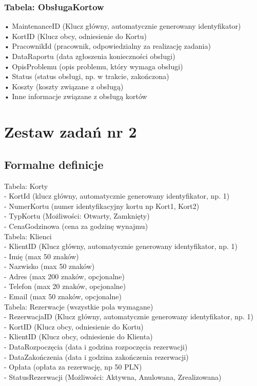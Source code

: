 \documentclass{article}
\begin{document}
\subsubsection*{Tabela: ObsługaKortow}
•	MaintenanceID (Klucz główny, automatycznie generowany identyfikator)\\
•	KortID (Klucz obcy, odniesienie do Kortu)\\
•	PracownikId (pracownik, odpowiedzialny za realizację zadania)\\
•	DataRaportu (data zgłoszenia konieczności obsługi)\\
•	OpisProblemu (opis problemu, który wymaga obsługi)\\
•	Status (status obsługi, np. w trakcie, zakończona)\\
•	Koszty (koszty związane z obsługą)\\
•	Inne informacje związane z obsługą kortów

\section*{Zestaw zadań nr 2}

\subsection*{Formalne definicje}

Tabela: Korty\\
- KortId (klucz główny, automatycznie generowany identyfikator, np. 1)\\
- NumerKortu (numer identyfikacyjny kortu np Kort1, Kort2)\\
- TypKortu (Możliwości: Otwarty, Zamknięty)\\
- CenaGodzinowa (cena za godzinę wynajmu)\\

Tabela: Klienci\\
- KlientID (Klucz główny, automatycznie generowany identyfikator, np. 1)\\
- Imię (max 50 znaków)\\
- Nazwisko (max 50 znaków)\\
- Adres (max 200 znaków, opcjonalne)\\
- Telefon (max 20 znaków, opcjonalne)\\
- Email (max 50 znaków, opcjonalne)\\

Tabela: Rezerwacje (wszystkie pola wymagane)\\
- RezerwacjaID (Klucz główny, automatycznie generowany identyfikator, np. 1)\\
- KortID (Klucz obcy, odniesienie do Kortu)\\
- KlientID (Klucz obcy, odniesienie do Klienta)\\
- DataRozpoczęcia (data i godzina rozpoczęcia rezerwacji)\\
- DataZakończenia (data i godzina zakończenia rezerwacji)\\
- Opłata (opłata za rezerwację, np 50 PLN)\\
- StatusRezerwacji (Możliwości: Aktywna, Anulowana, Zrealizowana)\\
\end{document}
